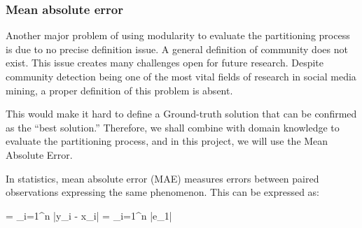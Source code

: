 \subsubsection{Mean absolute error}
Another major problem of using modularity to evaluate the partitioning process is due to no precise definition issue. A general definition of community does not exist. This issue creates many challenges open for future research. Despite community detection being one of the most vital fields of research in social media mining, a proper definition of this problem is absent.

This would make it hard to define a Ground-truth solution that can be confirmed as the “best solution.” Therefore, we shall combine with domain knowledge to evaluate the partitioning process, and in this project, we will use the Mean Absolute Error.

In statistics, mean absolute error (MAE) measures errors between paired observations expressing the same phenomenon. This can be expressed as:

 =  \sum_{i=1}^{n} |y_i - x_i| =  \sum_{i=1}^{n} |e_1|
